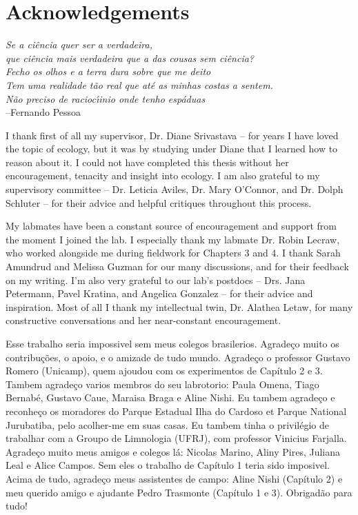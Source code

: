 \chapter*{Acknowledgements}

\begin{quoteshrink}
  \emph{Se a ci\^encia quer ser a verdadeira,\\
que ci\^encia mais verdadeira que a das cousas sem ci\^encia?\\
Fecho os olhos e a terra dura sobre que me deito\\
Tem uma realidade t\~ao real que at\'e as minhas costas a sentem.\\ 
N\~ao preciso de racioc\'{\i}inio onde tenho esp\'aduas}\\
  \hfill --Fernando Pessoa
\end{quoteshrink}


I thank first of all my supervisor, Dr. Diane Srivastava -- for years I have loved the topic of ecology, but it was by studying under Diane that I learned how to reason about it. I could not have completed this thesis without her encouragement, tenacity and insight into ecology.  I am also grateful to my supervisory committee -- Dr. Leticia Aviles, Dr. Mary O'Connor, and Dr. Dolph Schluter -- for their advice and helpful critiques throughout this process. 

My labmates have been a constant source of encouragement and support from the moment I joined the lab. I especially thank my labmate Dr. Robin Lecraw, who worked alongside me during fieldwork for Chapters 3 and 4. I thank Sarah Amundrud and Melissa Guzman for our many discussions, and for their feedback on my writing. I'm also very grateful to our lab's postdocs -- Drs. Jana Petermann, Pavel Kratina, and Angelica Gonzalez -- for their advice and inspiration. Most of all I thank my intellectual twin, Dr. Alathea Letaw, for many constructive conversations and her near-constant encouragement.

Esse trabalho seria impossivel sem meus colegos brasilerios. Agrade\c{c}o muito os contribu\c{c}\~oes, o apoio, e o amizade de tudo mundo. Agrade\c{c}o o professor Gustavo Romero (Unicamp), quem ajoudou com os experimentos de Cap\'itulo 2 e 3. Tambem agrade\c{c}o varios membros do seu labrotorio: Paula Omena, Tiago Bernab\'e, Gustavo Caue, Maraisa Braga e Aline Nishi. Eu tambem agrade\c{c}o e reconhe\c{c}o os moradores do Parque Estadual Ilha do Cardoso et Parque National Jurubatiba, pelo acolher-me em suas casas. Eu tambem tinha o privil\'egio de trabalhar com a Groupo de Limnologia (UFRJ), com professor Vinicius Farjalla. Agrade\c{c}o muito meus amigos e colegos l\'a: Nicolas Marino, Aliny Pires, Juliana Leal e Alice Campos. Sem eles o trabalho de Cap\'itulo 1 teria sido imposivel. Acima de tudo, agrade\c{c}o meus assistentes de campo: Aline Nishi (Cap\'itulo 2) e meu querido amigo e ajudante Pedro Trasmonte (Cap\'itulo 1 e 3). Obrigad\~ao para tudo!


